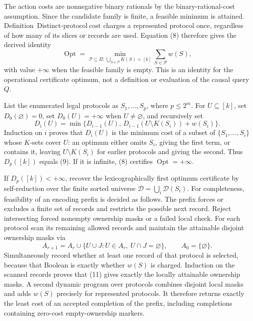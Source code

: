 The action costs are nonnegative binary rationals by the binary-rational-cost assumption.  Since the candidate family is finite, a feasible minimum is attained.  Definition~\(\mathrm{Distinct\text{-}protocol\ cost}\) charges a represented protocol once, regardless of how many of its slices or records are used.  Equation (8) therefore gives the derived identity
\[
  \operatorname{Opt}
  =\min_{\mathcal P\subseteq\Pi:\,\bigcup_{S\in\mathcal P}K(S)=[k]}
       \sum_{S\in\mathcal P}w(S), \tag{9}
\]
with value \(+\infty\) when the feasible family is empty.  This is an identity for the operational certificate optimum, not a definition or evaluation of the causal query \(Q\).

List the enumerated legal protocols as \(S_1,\ldots,S_p\), where \(p\leq2^m\).  For \(U\subseteq[k]\), set \(D_0(\varnothing)=0\), set \(D_0(U)=+\infty\) when \(U\neq\varnothing\), and recursively set
\[
  D_i(U)=\min\bigl\{D_{i-1}(U),\,
  D_{i-1}(U\setminus K(S_i))+w(S_i)\bigr\}. \tag{10}
\]
Induction on \(i\) proves that \(D_i(U)\) is the minimum cost of a subset of \(\{S_1,\ldots,S_i\}\) whose \(K\)-sets cover \(U\): an optimum either omits \(S_i\), giving the first term, or contains it, leaving \(U\setminus K(S_i)\) for earlier protocols and giving the second.  Thus \(D_p([k])\) equals (9).  If it is infinite, (8) certifies \(\operatorname{Opt}=+\infty\).

If \(D_p([k])<+\infty\), recover the lexicographically first optimum certificate by self-reduction over the finite sorted universe \(\mathcal D=\bigcup_i\mathcal D(S_i)\).  For completeness, feasibility of an encoding prefix is decided as follows.  The prefix forces or excludes a finite set of records and restricts the possible next record.  Reject intersecting forced nonempty ownership masks or a failed local check.  For each protocol scan its remaining allowed records and maintain the attainable disjoint ownership masks via
\[
  A_{r+1}=A_r\cup
  \{U\cup J:U\in A_r,\ U\cap J=\varnothing\},
  \qquad A_0=\{\varnothing\}. \tag{11}
\]
Simultaneously record whether at least one record of that protocol is selected, because that Boolean is exactly whether \(w(S)\) is charged.  Induction on the scanned records proves that (11) gives exactly the locally attainable ownership masks.  A second dynamic program over protocols combines disjoint local masks and adds \(w(S)\) precisely for represented protocols.  It therefore returns exactly the least cost of an accepted completion of the prefix, including completions containing zero-cost empty-ownership markers.

